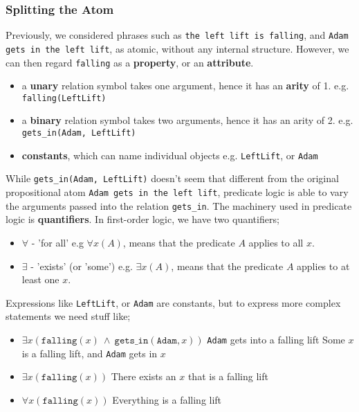 \documentclass[a4paper, 12pt]{article}
\begin{document}
        \subsubsection*{Splitting the Atom}
        Previously, we considered phrases such as \texttt{the left lift is falling}, and \texttt{Adam gets in the left lift}, as atomic, without any internal structure. However, we can then regard \texttt{falling} as a \textbf{property}, or an \textbf{attribute}.
        \begin{itemize}
            \item a \textbf{unary} relation symbol takes one argument, hence it has an \textbf{arity} of 1.
                \subitem e.g. \texttt{falling(LeftLift)}
            \item a \textbf{binary} relation symbol takes two arguments, hence it has an arity of 2.
                \subitem e.g. \texttt{gets\_in(Adam, LeftLift)}
            \item \textbf{constants}, which can name individual objects
                \subitem e.g. \texttt{LeftLift}, or \texttt{Adam}
        \end{itemize}
        While \texttt{gets\_in(Adam, LeftLift)} doesn't seem that different from the original propositional atom \texttt{Adam gets in the left lift}, predicate logic is able to vary the arguments passed into the relation \texttt{gets\_in}. The machinery used in predicate logic is \textbf{quantifiers}. In first-order logic, we have two quantifiers;
        \begin{itemize}
            \item $\forall$ - 'for all' \hfill e.g $\forall x (A)$, means that the predicate $A$ applies to all $x$.
            \item $\exists$ - 'exists' (or 'some') \hfill e.g. $\exists x (A)$, means that the predicate $A$ applies to at least one $x$.
        \end{itemize}
        Expressions like \texttt{LeftLift}, or \texttt{Adam} are constants, but to express more complex statements we need stuff like;
        \begin{itemize}
            \item $\exists x (\texttt{falling}(x)\ \land\ \texttt{gets\_in}(\texttt{Adam}, x))$ \hfill \texttt{Adam} gets into a falling lift
                \subitem \hfill Some $x$ is a falling lift, and \texttt{Adam} gets in $x$
            \item $\exists x (\texttt{falling}(x))$ \hfill There exists an $x$ that is a falling lift
            \item $\forall x (\texttt{falling}(x))$ \hfill Everything is a falling lift
        \end{itemize}
\end{document}
